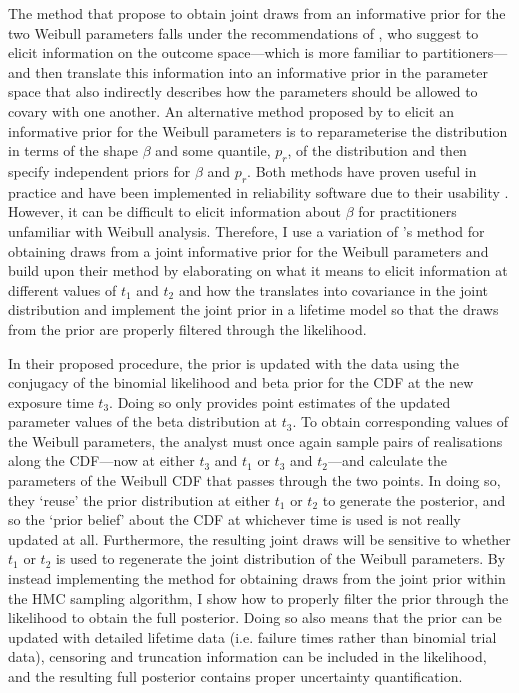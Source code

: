 The method that \citeauthor{kaminskiy2005} propose to obtain joint draws from an informative prior for the two Weibull parameters falls under the recommendations of \citet{gelman_workflow_2020}, who suggest to elicit information on the outcome space---which is more familiar to partitioners---and then translate this information into an informative prior in the parameter space that also indirectly describes how the parameters should be allowed to covary with one another. An alternative method proposed by \citet{Meeker2022} to elicit an informative prior for the Weibull parameters is to reparameterise the distribution in terms of the shape $\beta$ and some quantile, $p_r$, of the distribution and then specify independent priors for $\beta$ and $p_r$. Both methods have proven useful in practice and have been implemented in reliability software due to their usability \citep{krivtsov2017}. However, it can be difficult to elicit information about $\beta$ for practitioners unfamiliar with Weibull analysis. Therefore, I use a variation of \citeauthor{kaminskiy2005}'s method for obtaining draws from a joint informative prior for the Weibull parameters and build upon their method by elaborating on what it means to elicit information at different values of $t_1$ and $t_2$ and how the translates into covariance in the joint distribution and implement the joint prior in a lifetime model so that the draws from the prior are properly filtered through the likelihood.

In their proposed procedure, the prior is updated with the data using the conjugacy of the binomial likelihood and beta prior for the CDF at the new exposure time $t_3$. Doing so only provides point estimates of the updated parameter values of the beta distribution at $t_3$. To obtain corresponding values of the Weibull parameters, the analyst must once again sample pairs of realisations along the CDF---now at either $t_3$ and $t_1$ or $t_3$ and $t_2$---and calculate the parameters of the Weibull CDF that passes through the two points. In doing so, they `reuse' the prior distribution at either $t_1$ or $t_2$ to generate the posterior, and so the `prior belief' about the CDF at whichever time is used is not really updated at all. Furthermore, the resulting joint draws will be sensitive to whether $t_1$ or $t_2$ is used to regenerate the joint distribution of the Weibull parameters. By instead implementing the method for obtaining draws from the joint prior within the HMC sampling algorithm, I show how to properly filter the prior through the likelihood to obtain the full posterior. Doing so also means that the prior can be updated with detailed lifetime data (i.e. failure times rather than binomial trial data), censoring and truncation information can be included in the likelihood, and the resulting full posterior contains proper uncertainty quantification. 

